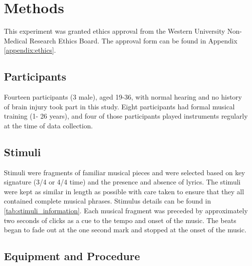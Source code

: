 \chapter{Methods}
This experiment was granted ethics approval from the Western University Non-Medical Research Ethics Board. 
The approval form can be found in Appendix \ref{appendix:ethics}.
\section{Participants}
Fourteen participants (3 male), aged 19-36, with normal hearing and no history of brain injury took part in this study. Eight participants had formal musical training (1- 26 years), and four of those participants played instruments regularly at the time of data collection.
\section{Stimuli}
Stimuli were fragments of familiar musical pieces and were selected based on key signature (3/4 or 4/4 time) and the presence and absence of lyrics. The stimuli were kept as similar in length as possible with care taken to ensure that they all contained complete musical phrases. Stimulus details can be found in \autoref{tab:stimuli_information}.
Each musical fragment was preceded by approximately two seconds of clicks as a cue to the tempo and onset of the music. The beats began to fade out at the one second mark and stopped at the onset of the music. 

\section{Equipment and Procedure}
